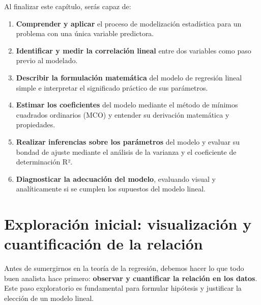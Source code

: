 \documentclass[
  letterpaper,
  DIV=11,
  numbers=noendperiod]{scrreprt}
\providecommand{\tightlist}{%
  \setlength{\itemsep}{0pt}\setlength{\parskip}{0pt}}
\begin{document}
\begin{tcolorbox}[enhanced jigsaw, breakable, toprule=.15mm, bottomtitle=1mm, coltitle=black, colbacktitle=quarto-callout-important-color!10!white, titlerule=0mm, opacitybacktitle=0.6, bottomrule=.15mm, toptitle=1mm, title=\textcolor{quarto-callout-important-color}{\faExclamation}\hspace{0.5em}{Objetivos de aprendizaje}, arc=.35mm, rightrule=.15mm, opacityback=0, colframe=quarto-callout-important-color-frame, leftrule=.75mm, left=2mm, colback=white]

Al finalizar este capítulo, serás capaz de:

\begin{enumerate}
\def\labelenumi{\arabic{enumi}.}
\tightlist
\item
  \textbf{Comprender y aplicar} el proceso de modelización estadística
  para un problema con una única variable predictora.
\item
  \textbf{Identificar y medir la correlación lineal} entre dos variables
  como paso previo al modelado.
\item
  \textbf{Describir la formulación matemática} del modelo de regresión
  lineal simple e interpretar el significado práctico de sus parámetros.
\item
  \textbf{Estimar los coeficientes} del modelo mediante el método de
  mínimos cuadrados ordinarios (MCO) y entender su derivación matemática
  y propiedades.
\item
  \textbf{Realizar inferencias sobre los parámetros} del modelo y
  evaluar su bondad de ajuste mediante el análisis de la varianza y el
  coeficiente de determinación R².
\item
  \textbf{Diagnosticar la adecuación del modelo}, evaluando visual y
  analíticamente si se cumplen los supuestos del modelo lineal.
\end{enumerate}

\end{tcolorbox}

\section{Exploración inicial: visualización y cuantificación de la
relación}\label{exploraciuxf3n-inicial-visualizaciuxf3n-y-cuantificaciuxf3n-de-la-relaciuxf3n}

Antes de sumergirnos en la teoría de la regresión, debemos hacer lo que
todo buen analista hace primero: \textbf{observar y cuantificar la
relación en los datos}. Este paso exploratorio es fundamental para
formular hipótesis y justificar la elección de un modelo lineal.
\end{document}
